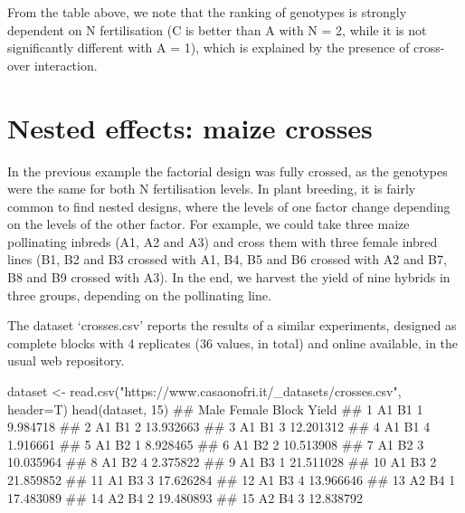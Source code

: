 \documentclass[a4paper,12pt,oneside]{book}
\newenvironment{Shaded}{\begin{snugshade}}{\end{snugshade}}
\newcommand{\DecValTok}[1]{#1}
\newcommand{\StringTok}[1]{#1}
\newcommand{\DocumentationTok}[1]{#1}
\newcommand{\OtherTok}[1]{#1}
\newcommand{\FunctionTok}[1]{#1}
\newcommand{\AttributeTok}[1]{#1}
\newcommand{\NormalTok}[1]{#1}
\begin{document}
From the table above, we note that the ranking of genotypes is strongly dependent on N fertilisation (C is better than A with N = 2, while it is not significantly different with A = 1), which is explained by the presence of cross-over interaction.

\hypertarget{nested-effects-maize-crosses}{%
\section{Nested effects: maize crosses}\label{nested-effects-maize-crosses}}

In the previous example the factorial design was fully crossed, as the genotypes were the same for both N fertilisation levels. In plant breeding, it is fairly common to find nested designs, where the levels of one factor change depending on the levels of the other factor. For example, we could take three maize pollinating inbreds (A1, A2 and A3) and cross them with three female inbred lines (B1, B2 and B3 crossed with A1, B4, B5 and B6 crossed with A2 and B7, B8 and B9 crossed with A3). In the end, we harvest the yield of nine hybrids in three groups, depending on the pollinating line.

The dataset `crosses.csv' reports the results of a similar experiments, designed as complete blocks with 4 replicates (36 values, in total) and online available, in the usual web repository.

\vspace{12pt}

\begin{Shaded}
\begin{Highlighting}[]
\NormalTok{dataset }\OtherTok{\textless{}{-}} \FunctionTok{read.csv}\NormalTok{(}\StringTok{"https://www.casaonofri.it/\_datasets/crosses.csv"}\NormalTok{, }\AttributeTok{header=}\NormalTok{T)}
\FunctionTok{head}\NormalTok{(dataset, }\DecValTok{15}\NormalTok{)}
\DocumentationTok{\#\#    Male Female Block     Yield}
\DocumentationTok{\#\# 1    A1     B1     1  9.984718}
\DocumentationTok{\#\# 2    A1     B1     2 13.932663}
\DocumentationTok{\#\# 3    A1     B1     3 12.201312}
\DocumentationTok{\#\# 4    A1     B1     4  1.916661}
\DocumentationTok{\#\# 5    A1     B2     1  8.928465}
\DocumentationTok{\#\# 6    A1     B2     2 10.513908}
\DocumentationTok{\#\# 7    A1     B2     3 10.035964}
\DocumentationTok{\#\# 8    A1     B2     4  2.375822}
\DocumentationTok{\#\# 9    A1     B3     1 21.511028}
\DocumentationTok{\#\# 10   A1     B3     2 21.859852}
\DocumentationTok{\#\# 11   A1     B3     3 17.626284}
\DocumentationTok{\#\# 12   A1     B3     4 13.966646}
\DocumentationTok{\#\# 13   A2     B4     1 17.483089}
\DocumentationTok{\#\# 14   A2     B4     2 19.480893}
\DocumentationTok{\#\# 15   A2     B4     3 12.838792}
\end{Highlighting}
\end{Shaded}
\end{document}
